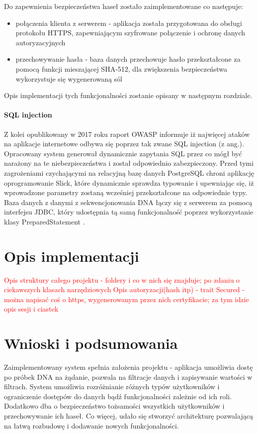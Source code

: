 \documentclass[a4paper,12pt,twoside]{article}
\begin{document}
Do zapewnienia bezpieczeństwa haseł zostało zaimplementowane co następuje:
\begin{itemize}
\item{połączenia klienta z serwerem} - aplikacja została przygotowana do obsługi protokołu HTTPS,
zapewniającym szyfrowane połączenie i ochronę danych autoryzacyjnych
\item{przechowywanie hasła - baza danych przechowuje hasło przekształcone za pomocą funkcji mieszającej SHA-512, dla zwiększenia bezpieczeństwa wykorzystuje się wygenerowaną sól 
}
\end{itemize}
Opis implementacji tych funkcjonalności zostanie opisany w następnym rozdziale.

\paragraph{SQL injection} Z kolei opublikowany w 2017 roku raport OWASP \cite{owasp}
informuje iż najwięcej ataków na aplikacje internetowe odbywa się poprzez tak zwane SQL injection (z ang.). 
Opracowany system generował dynamicznie zapytania SQL przez co mógł być narażony na te niebezpieczeństwa i został odpowiednio zabezpieczony.
Przed tymi zagrożeniami czychającymi na relacyjną bazę danych PostgreSQL chroni aplikację oprogramowanie Slick, które dynamicznie sprawdza typowanie i upewniając się, iż wprowadzone parametry
zostaną wcześniej przekształcone na odpowiednie typy.
Baza danych z danymi z sekwencjonowania DNA łączy się z serwerem za pomocą interfejsu JDBC,
który udostępnia tą samą funkcjonalność poprzez wykorzystanie klasy PreparedStatement \cite{preparedStatement}.

\newpage

\section{Opis implementacji}
\textcolor{red}{
Opis struktury całego projektu - foldery i co w nich się znajduje;
po zdaniu o ciekawszych klasach narzędziowych
\newline
Opis autoryzacji(hash itp) - trait Secured - można napisać coś o https, wygenerowanym przez nich certyfikacie;
za tym idzie opis sesji i ciastek
}
\newpage
\section{Wnioski i podsumowania}  

Zaimplementowany system spełnia założenia projektu - aplikacja
umożliwia dostę po próbek DNA na żądanie, pozwala na filtracje danych
i zapisywanie wartości w filtrach. 
System umożliwia rozróżnianie różnych typów użytkowników 
i ograniczenie dostępów do danych bądź funkcjonalności zależnie od ich
roli.
Dodatkowo dba o bezpieczeństwo
tożsamości wszystkich użytkowników i przechowywanie ich haseł.
Co więcej, udało się stworzyć
architekturę pozwalającą na łatwą rozbudowę 
i dodawanie nowych funkcjonalności. 
\end{document}
